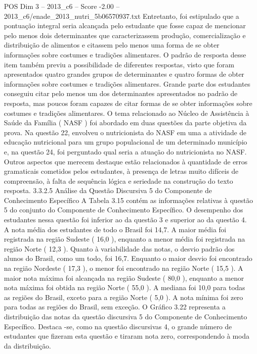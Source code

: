 \begin{textsample}{POS Dim 3 – 2013\_c6 – Score -2.00 – 2013\_c6/enade\_2013\_nutri\_5b06570937.txt}
Entretanto, foi estipulado que a pontuação integral seria alcançada pelo estudante que fosse capaz de mencionar pelo menos dois determinantes que caracterizassem produção, comercialização e distribuição de alimentos e citassem pelo menos uma forma de se obter informações sobre costumes e tradições alimentares.
O padrão de resposta desse item também previu a possibilidade de diferentes respostas, visto que foram apresentados quatro grandes grupos de determinantes e quatro formas de obter informações sobre costumes e tradições alimentares.
Grande parte dos estudantes conseguiu citar pelo menos um dos determinantes apresentados no padrão de resposta, mas poucos foram capazes de citar formas de se obter informações sobre costumes e tradições alimentares.
O tema relacionado ao Núcleo de Assistência à Saúde da Família ( NASF ) foi abordado em duas questões da parte objetiva da prova.
Na questão 22, envolveu o nutricionista do NASF em uma a atividade de educação nutricional para um grupo populacional de um determinado município e, na questão 24, foi perguntado qual seria a atuação do nutricionista no NASF.
Outros aspectos que merecem destaque estão relacionados à quantidade de erros gramaticais cometidos pelos estudantes, à presença de letras muito difíceis de compreensão, à falta de sequência lógica e seriedade na construção do texto resposta. 3.3.2.5 Análise da Questão Discursiva 5 do Componente de Conhecimento Específico A Tabela 3.15 contém as informações relativas à questão 5 do conjunto do Componente de Conhecimento Específico.
O desempenho dos estudantes nessa questão foi inferior ao da questão 3 e superior ao da questão 4.
A nota média dos estudantes de todo o Brasil foi 14,7.
A maior média foi registrada na região Sudeste ( 16,0 ), enquanto a menor média foi registrada na região Norte ( 12,3 ).
Quanto à variabilidade das notas, o desvio padrão dos alunos do Brasil, como um todo, foi 16,7.
Enquanto o maior desvio foi encontrado na região Nordeste ( 17,3 ), o menor foi encontrado na região Norte ( 15,5 ).
A maior nota máxima foi alcançada na região Sudeste ( 80,0 ), enquanto a menor nota máxima foi obtida na região Norte ( 55,0 ).
A mediana foi 10,0 para todas as regiões do Brasil, exceto para a região Norte ( 5,0 ).
A nota mínima foi zero para todas as regiões do Brasil, sem exceção.
O Gráfico 3.22 representa a distribuição das notas da questão discursiva 5 do Componente de Conhecimento Específico.
Destaca -se, como na questão discursivas 4, o grande número de estudantes que fizeram esta questão e tiraram nota zero, correspondendo à moda da distribuição.

\end{textsample}
